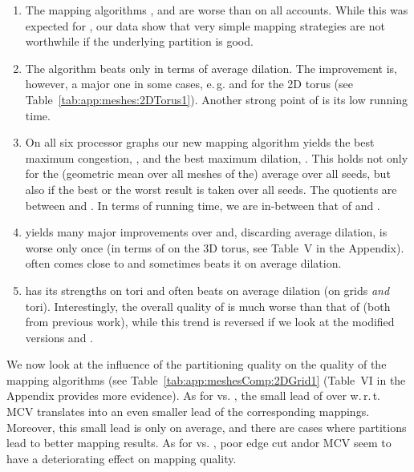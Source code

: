 \documentclass[pdftex]{llncs}
\newcommand{\eg}{e.\,g.\xspace}
\newcommand{\wrt}{w.\,r.\,t.\xspace}
\begin{document}
\begin{enumerate}
\item The mapping algorithms ,  and  are worse than
   on all accounts. While this was expected for , our data show
  that very simple mapping strategies are not worthwhile if the underlying
  partition is good.

\item The algorithm  beats  only in terms of
  average dilation. The improvement is, however, a major one in some
  cases, \eg  and 
  for the  2D torus (see
  Table~\ref{tab:app:meshes:2DTorus1}). Another strong point of
   is its low running time.


\item On all six processor graphs our new mapping algorithm
   yields the best maximum congestion, , and the best
  maximum dilation, . This holds not only for the (geometric mean
  over all meshes of the) average over all seeds, but also if the best
  or the worst result is taken over all seeds. The quotients are
  between  and . In terms of running time, we are
  in-between that of  and .

\item  yields many major improvements over  and,
  discarding average dilation, is worse only once (in terms of
   on the 3D torus, see Table~V in the
  Appendix).  often comes close to  and
  sometimes beats it on average dilation.

\item  has its strengths on tori and often beats
   on average dilation (on grids \emph{and}
  tori). Interestingly, the overall quality of  is much
  worse than that of  (both from previous work),
  while this trend is reversed if we
  look at the modified versions  and .
\end{enumerate}

We now look at the influence of the partitioning quality on the
quality of the mapping algorithms (see
Table~\ref{tab:app:meshesComp:2DGrid1} (Table~VI in the Appendix
provides more evidence). As for  vs. , the small
lead of  over  \wrt MCV translates into an even
smaller lead of the corresponding mappings. Moreover, this small lead
is only on average, and there are cases where  partitions
lead to better mapping results.  As for  vs. , poor
edge cut andor MCV seem to have a deteriorating effect on
mapping quality.
\end{document}
